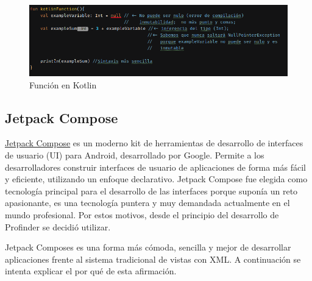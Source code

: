 \begin{figure}[h]
	\centering
	\includegraphics[width = 1\textwidth]{Imagenes/Fuentes/kotlinFun.png}
	\caption{Función en Kotlin}
	\label{fig:kotlinFun}
\end{figure}

\hypertarget{subsec:compose}{}
\subsection{Jetpack Compose}
\href{https://developer.android.com/develop/ui/compose}{Jetpack Compose} es un moderno kit de herramientas de desarrollo de interfaces de usuario (UI) para Android, desarrollado por Google. Permite a los desarrolladores construir interfaces de usuario de aplicaciones de forma más fácil y eficiente, utilizando un enfoque declarativo. Jetpack Compose fue elegida como tecnología principal para el desarrollo de las interfaces porque suponía un reto apasionante, es una tecnología puntera y muy demandada actualmente en el mundo profesional. Por estos motivos, desde el principio del desarrollo de Profinder se decidió utilizar. 

Jetpack Composes es una forma más cómoda, sencilla y mejor de desarrollar aplicaciones frente al sistema tradicional de vistas con XML. A continuación se intenta explicar el por qué de esta afirmación.
